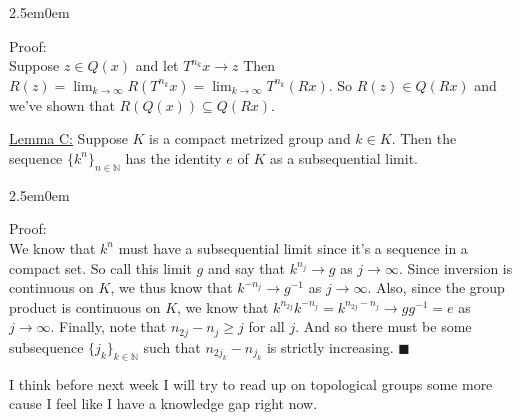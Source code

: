 \documentclass{book}
\newcommand{\pracTwo}{
   \color{Orange}%
   \fontsize{12}{14}\selectfont%
}
\newenvironment{myIndent}{%
   \begin{adjustwidth}{2.5em}{0em}%
}{%
   \end{adjustwidth}%
}
\newcommand{\mySepTwo}[1][.]{%
   {\noindent\color{#1}{\rule{6.5in}{0.5mm}}}\\%
}
\newcommand{\retTwo}{\hfill\bigbreak}
\begin{document}
\begin{myIndent}\pracTwo
	Proof:\\
	Suppose $z \in Q(x)$ and let $T^{n_k}x \to z$ Then $R(z) = \lim_{k \to \infty} R(T^{n_k}x) = \lim_{k \to \infty}T^{n_k}(Rx)$. So $R(z) \in Q(Rx)$ and we've shown that $R(Q(x)) \subseteq Q(Rx)$.\retTwo
\end{myIndent}

\ul{Lemma C:} Suppose $K$ is a compact metrized group and $k \in K$. Then the sequence $\{k^n\}_{n \in \mathbb{N}}$ has the identity $e$ of $K$ as a subsequential limit.

\begin{myIndent}\pracTwo
	Proof:\\
	We know that $k^n$ must have a subsequential limit since it's a sequence in a compact set. So call this limit $g$ and say that $k^{n_j} \to g$ as $j \to \infty$. Since inversion is continuous on $K$, we thus know that $k^{-n_j} \to g^{-1}$ as $j \to \infty$. Also, since the group product is continuous on $K$, we know that $k^{n_{2j}}k^{-n_j} = k^{n_{2j} - n_j} \to gg^{-1} = e$ as $j \to \infty$. Finally, note that $n_{2j} - n_j \geq j$ for all $j$. And so there must be some subsequence $\{j_{k}\}_{k \in \mathbb{N}}$ such that $n_{2j_k} - n_{j_k}$ is strictly increasing. $\blacksquare$\retTwo
\end{myIndent}

I think before next week I will try to read up on topological groups some more cause I feel like I have a knowledge gap right now.\\
\mySepTwo
\end{document}
